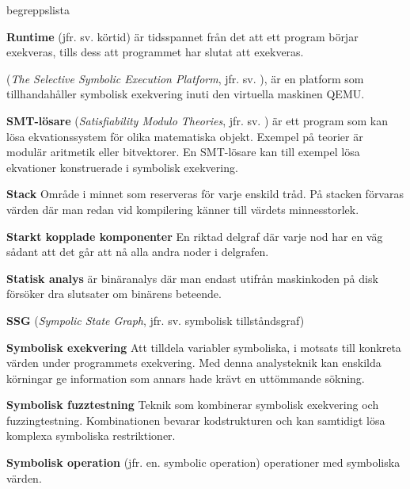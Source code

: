 \begin{labeling}{begreppslista}
    \item [\textbf{Runtime}] (jfr. sv. körtid) är tidsspannet från det att ett
    program börjar exekveras, tills dess att programmet har slutat att
    exekveras.

    \item [\textbf{\stoe}] (\emph{The Selective Symbolic Execution Platform},
          jfr. sv. ), är en platform som tillhandahåller symbolisk exekvering inuti
    den virtuella maskinen QEMU.

    \item [\textbf{SMT-lösare}] (\emph{Satisfiability Modulo Theories}, jfr. sv.
          ) är ett program som kan lösa ekvationssystem för olika matematiska objekt.
    Exempel på teorier är modulär aritmetik eller bitvektorer. En SMT-lösare kan
    till exempel lösa ekvationer konstruerade i symbolisk exekvering.

    \item [\textbf{Stack}] Område i minnet som reserveras för varje enskild
    tråd.  På stacken förvaras värden där man redan vid kompilering känner till
    värdets minnesstorlek.

    \item [\textbf{Starkt kopplade komponenter}] En riktad delgraf där varje nod
    har en väg sådant att det går att nå alla andra noder i delgrafen.

    \item [\textbf{Statisk analys}] är binäranalys där man endast utifrån
    maskinkoden på disk försöker dra slutsater om binärens beteende.

    \item [\textbf{SSG}] (\emph{Sympolic State Graph}, jfr. sv. symbolisk
          tillståndsgraf)

    \item [\textbf{Symbolisk exekvering}] Att tilldela variabler symboliska, i
    motsats till konkreta värden under programmets exekvering. Med denna
    analysteknik kan enskilda körningar ge information som annars hade krävt en
    uttömmande sökning.

    \item [\textbf{Symbolisk fuzztestning}] Teknik som kombinerar symbolisk
    exekvering och fuzzingtestning. Kombinationen bevarar kodstrukturen och kan
    samtidigt lösa komplexa symboliska restriktioner.

    \item [\textbf{Symbolisk operation}] (jfr. en. symbolic operation)
    operationer med symboliska värden.


\end{labeling}
